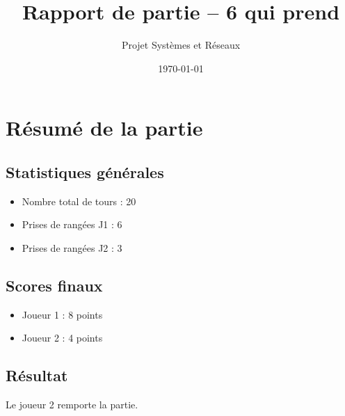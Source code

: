 \documentclass[11pt]{article}
\title{Rapport de partie -- 6 qui prend}
\author{Projet Systèmes et Réseaux}
\date{\today}
\begin{document}
\maketitle

\section*{Résumé de la partie}
\subsection*{Statistiques générales}
\begin{itemize}
\item Nombre total de tours : 20
\item Prises de rangées J1 : 6
\item Prises de rangées J2 : 3
\end{itemize}
\subsection*{Scores finaux}
\begin{itemize}
\item Joueur 1 : 8 points
\item Joueur 2 : 4 points
\end{itemize}
\subsection*{Résultat}
Le joueur 2 remporte la partie.
\end{document}
